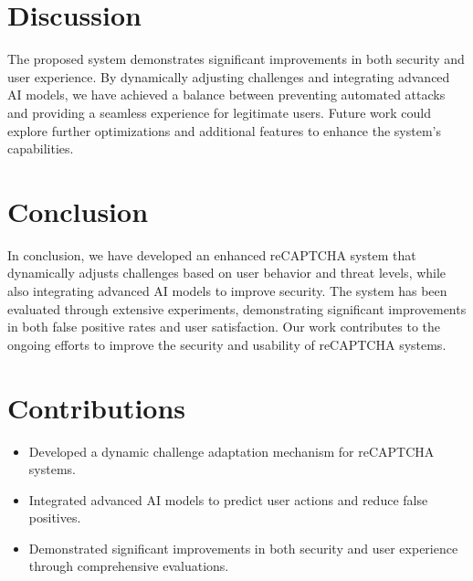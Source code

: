 \documentclass{article}
\begin{document}
\section{Discussion}
The proposed system demonstrates significant improvements in both security and user experience. By dynamically adjusting challenges and integrating advanced AI models, we have achieved a balance between preventing automated attacks and providing a seamless experience for legitimate users. Future work could explore further optimizations and additional features to enhance the system's capabilities.

\section{Conclusion}
In conclusion, we have developed an enhanced reCAPTCHA system that dynamically adjusts challenges based on user behavior and threat levels, while also integrating advanced AI models to improve security. The system has been evaluated through extensive experiments, demonstrating significant improvements in both false positive rates and user satisfaction. Our work contributes to the ongoing efforts to improve the security and usability of reCAPTCHA systems.

\section{Contributions}
\begin{itemize}
    \item Developed a dynamic challenge adaptation mechanism for reCAPTCHA systems.
    \item Integrated advanced AI models to predict user actions and reduce false positives.
    \item Demonstrated significant improvements in both security and user experience through comprehensive evaluations.
\end{itemize}



\end{document}
